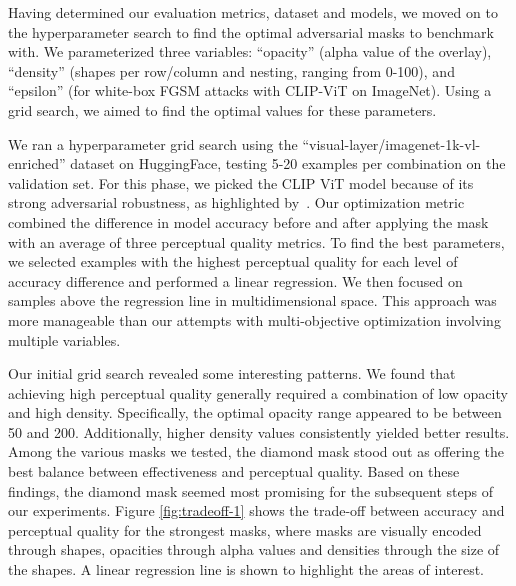 \documentclass[a4paper, oneside]{discothesis}
\begin{document}
Having determined our evaluation metrics, dataset and models, we moved on to the hyperparameter search to find the optimal adversarial masks to benchmark with. We parameterized three variables: ``opacity'' (alpha value of the overlay), ``density'' (shapes per row/column and nesting, ranging from 0-100), and ``epsilon'' (for white-box FGSM attacks with CLIP-ViT on ImageNet). Using a grid search, we aimed to find the optimal values for these parameters.

We ran a hyperparameter grid search using the ``visual-layer/imagenet-1k-vl-enriched'' dataset on HuggingFace, testing 5-20 examples per combination on the validation set. For this phase, we picked the CLIP ViT model because of its strong adversarial robustness, as highlighted by~\cite{wang2024roz}. Our optimization metric combined the difference in model accuracy before and after applying the mask with an average of three perceptual quality metrics. To find the best parameters, we selected examples with the highest perceptual quality for each level of accuracy difference and performed a linear regression. We then focused on samples above the regression line in multidimensional space. This approach was more manageable than our attempts with multi-objective optimization involving multiple variables.

Our initial grid search revealed some interesting patterns. We found that achieving high perceptual quality generally required a combination of low opacity and high density. Specifically, the optimal opacity range appeared to be between 50 and 200. Additionally, higher density values consistently yielded better results. Among the various masks we tested, the diamond mask stood out as offering the best balance between effectiveness and perceptual quality. Based on these findings, the diamond mask seemed most promising for the subsequent steps of our experiments. Figure \ref{fig:tradeoff-1} shows the trade-off between accuracy and perceptual quality for the strongest masks, where masks are visually encoded through shapes, opacities through alpha values and densities through the size of the shapes. A linear regression line is shown to highlight the areas of interest.
\end{document}
